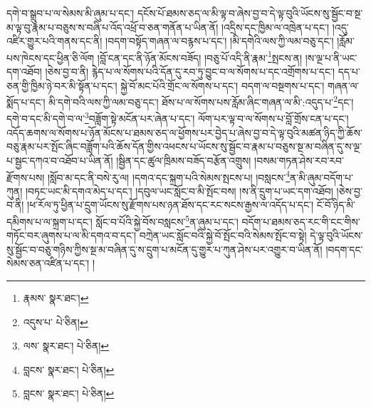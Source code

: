 དགེ་བ་སྒྲུབ་པ་ལ་སེམས་མི་ཞུམ་པ་དང་། དངོས་པོ་ཐམས་ཅད་ལ་མི་ལྟ་བ་ཞེས་བྱ་བ་དེ་ལྟ་བུའི་ཡོངས་སུ་སྦྱོང་བ་སྔ་མ་ལྟ་བུ་རྣམ་པ་བཅུས་ས་བཞི་པ་འོད་འཕྲོ་བ་ཅན་གནོན་པ་ཡིན་ནོ། །འདྲིས་དང་ཁྱིམ་ལ་འཁྲེན་པ་དང་། །འདུ་འཛིར་གྱུར་པའི་གནས་དང་ནི། །བདག་བསྟོད་གཞན་ལ་བརྙས་པ་དང་། །མི་དགེའི་ལས་ཀྱི་ལམ་བཅུ་དང་། །རློམ་པས་ཁེངས་དང་ཕྱིན་ཅི་ལོག །བློ་ངན་དང་ནི་ཉོན་མོངས་བཟོད། །བཅུ་པོ་འདི་ནི་རྣམ་\footnote{རྣམས་  སྣར་ཐང་། }སྤངས་ན། །ས་ལྔ་པ་ནི་ཡང་དག་འཐོབ། །ཅེས་བྱ་བ་ནི། རྙེད་པ་ལ་སོགས་པའི་དོན་དུ་རབ་ཏུ་བྱུང་བ་ལ་སོགས་པ་དང་འགྲོགས་པ་དང་། དད་པ་ཅན་གྱི་ཁྱིམ་ཉེ་བར་མི་སྟོན་པ་དང་། སྐྱེ་བོ་མང་པོའི་གྲོང་ལ་སོགས་པ་དང་། བདག་ལ་བསྔགས་པ་དང་། གཞན་ལ་སྨོད་པ་དང་། མི་དགེ་བའི་ལས་ཀྱི་ལམ་བཅུ་དང་། ཐོས་པ་ལ་སོགས་པས་རློམ་ཞིང་གཞན་ལ་མི་:འདུད་པ་\footnote{འདུས་པ་  པེ་ཅིན། }དང་། དགེ་བ་དང་མི་དགེ་བ་ལ་\footnote{ལས་  སྣར་ཐང་།  པེ་ཅིན། }བཟློག་སྟེ་མངོན་པར་ཞེན་པ་དང་། ལོག་པར་ལྟ་བ་ལ་སོགས་པ་བློ་གྲོས་ངན་པ་དང་། འདོད་ཆགས་ལ་སོགས་པ་ཉོན་མོངས་པ་ཐམས་ཅད་ལ་ཕྱོགས་པར་བྱེད་པ་ཞེས་བྱ་བ་དེ་ལྟ་བུའི་མཚན་ཉིད་ཀྱི་ཆོས་བཅུ་རྣམ་པར་སྤོང་ཞིང་བཟློག་པའི་ཆོས་དོན་གྱིས་འཕངས་པ་ཡོངས་སུ་སྦྱོང་བ་རྣམ་པ་བཅུས་སྔ་མ་བཞིན་དུ་ས་ལྔ་པ་སྦྱང་དཀའ་བ་འཐོབ་པ་ཡིན་ནོ། །སྦྱིན་དང་ཚུལ་ཁྲིམས་བཟོད་བརྩོན་འགྲུས། །བསམ་གཏན་ཤེས་རབ་རབ་རྫོགས་པས། །སློབ་མ་དང་ནི་བསེ་རུ་ལ། །དགའ་དང་སྐྲག་པའི་སེམས་སྤངས་པ། །བསླངས་\footnote{བླངས་  སྣར་ཐང་།  པེ་ཅིན། }ན་མི་ཞུམ་བདོག་པ་ཀུན། །བཏང་ཡང་མི་དགའ་མེད་པ་དང་། །དབུལ་ཡང་སློང་བ་མི་སྤོང་བས། །ས་ནི་དྲུག་པ་ཡང་དག་འཐོབ། །ཅེས་བྱ་བ་ནི། །ཕ་རོལ་ཏུ་ཕྱིན་པ་དྲུག་ཡོངས་སུ་རྫོགས་པས་ཉན་ཐོས་དང་རང་སངས་རྒྱས་ལ་འདོད་པ་དང་། ངོ་བོ་ཉིད་མི་དམིགས་པ་ལ་སྐྲག་པ་དང་། སློང་བ་པོའི་སྐྱེ་བོས་བསླངས་\footnote{བླངས་  སྣར་ཐང་།  པེ་ཅིན། }ན་ཞུམ་པ་དང་། བདོག་པ་ཐམས་ཅད་རང་གི་ངང་གིས་གཏོང་བར་ཞུགས་པ་ལ་མི་དགའ་བ་དང་། བཀྲེན་ཡང་སློང་བའི་སྐྱེ་བོ་སྤོང་བའི་སེམས་སྤོང་བ་སྟེ། དེ་ལྟ་བུའི་ཡོངས་སུ་སྦྱོང་བ་བཅུ་གཉིས་ཀྱིས་སྔ་མ་བཞིན་དུ་ས་དྲུག་པ་མངོན་དུ་གྱུར་པ་ཀུན་ཤེས་པར་འགྱུར་བ་ཡིན་ནོ། །བདག་དང་སེམས་ཅན་འཛིན་པ་དང་། །

